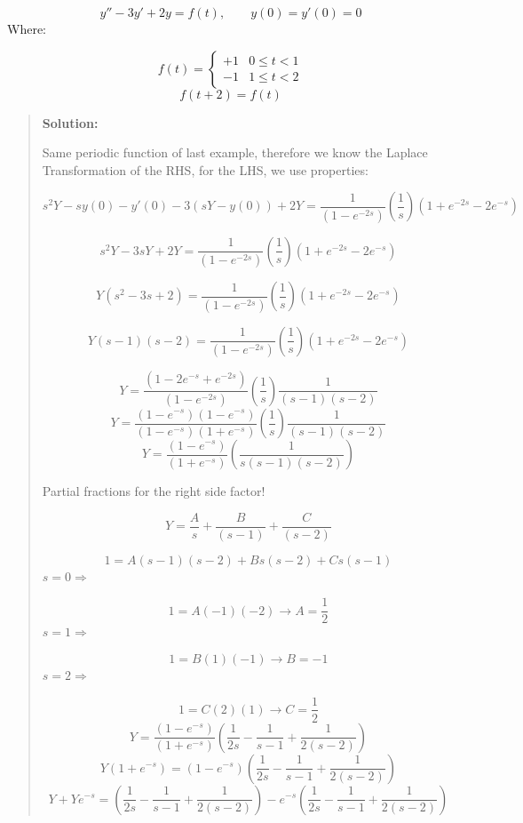 \documentclass[
  letterpaper,
  DIV=11,
  numbers=noendperiod]{scrreprt}
\theoremstyle{plain}
\theoremstyle{remark}
\begin{document}
\begin{tcolorbox}[enhanced jigsaw, title=\textcolor{quarto-callout-tip-color}{\faLightbulb}\hspace{0.5em}{Example}, colbacktitle=quarto-callout-tip-color!10!white, opacitybacktitle=0.6, opacityback=0, rightrule=.15mm, breakable, titlerule=0mm, colback=white, bottomtitle=1mm, colframe=quarto-callout-tip-color-frame, toprule=.15mm, leftrule=.75mm, toptitle=1mm, arc=.35mm, bottomrule=.15mm, left=2mm, coltitle=black]

\[y''-3y'+2y= f(t),\qquad y(0)=y'(0)=0\] Where:

\[
f(t) = 
\begin{cases} 
+1 & 0\leq t < 1 \\
-1 & 1\leq t < 2
\end{cases}
\] \[f(t+2)=f(t)\]

\begin{quote}
\textbf{Solution:}

Same periodic function of last example, therefore we know the Laplace
Transformation of the RHS, for the LHS, we use properties:

\[s^2Y-sy(0)-y'(0)-3(sY-y(0))+2Y= \frac{1}{\left(1-e^{-2s}\right)}\left(\frac{1}{s}\right)\left(1+e^{-2s}-2e^{-s}\right)\]

\[s^2Y-3sY+2Y= \frac{1}{\left(1-e^{-2s}\right)}\left(\frac{1}{s}\right)\left(1+e^{-2s}-2e^{-s}\right)\]

\[Y(s^2-3s+2)= \frac{1}{\left(1-e^{-2s}\right)}\left(\frac{1}{s}\right)\left(1+e^{-2s}-2e^{-s}\right)\]

\[Y(s-1)(s-2)= \frac{1}{\left(1-e^{-2s}\right)}\left(\frac{1}{s}\right)\left(1+e^{-2s}-2e^{-s}\right)\]

\[Y= \frac{\left(1-2e^{-s}+e^{-2s}\right)}{\left(1-e^{-2s}\right)}\left(\frac{1}{s}\right)\frac{1}{(s-1)(s-2)}\]
\[Y= \frac{(1-e^{-s})(1-e^{-s})}{(1-e^{-s})(1+e^{-s})}\left(\frac{1}{s}\right)\frac{1}{(s-1)(s-2)}\]
\[Y= \frac{(1-e^{-s})}{(1+e^{-s})}\left(\frac{1}{s(s-1)(s-2)}\right)\]

Partial fractions for the right side factor!

\[Y=\frac{A}{s}+\frac{B}{(s-1)}+\frac{C}{(s-2)}\]

\[1=A(s-1)(s-2)+Bs(s-2)+Cs(s-1)\] \(\boxed{s=0}\Rightarrow\)

\[1=A(-1)(-2)\rightarrow \boxed{A=\frac{1}{2}}\]
\(\boxed{s=1}\Rightarrow\)

\[1=B(1)(-1)\rightarrow \boxed{B=-1}\] \(\boxed{s=2}\Rightarrow\)

\[1=C(2)(1)\rightarrow \boxed{C=\frac{1}{2}}\]
\[Y=\frac{(1-e^{-s})}{(1+e^{-s})}\left(\frac{1}{2s}-\frac{1}{s-1}+\frac{1}{2(s-2)}\right)\]
\[Y(1+e^{-s})=(1-e^{-s})\left(\frac{1}{2s}-\frac{1}{s-1}+\frac{1}{2(s-2)}\right)\]
\[Y+Ye^{-s}=\left(\frac{1}{2s}-\frac{1}{s-1}+\frac{1}{2(s-2)}\right)-e^{-s}\left(\frac{1}{2s}-\frac{1}{s-1}+\frac{1}{2(s-2)}\right)\]


\end{quote}
\end{tcolorbox}
\end{document}
